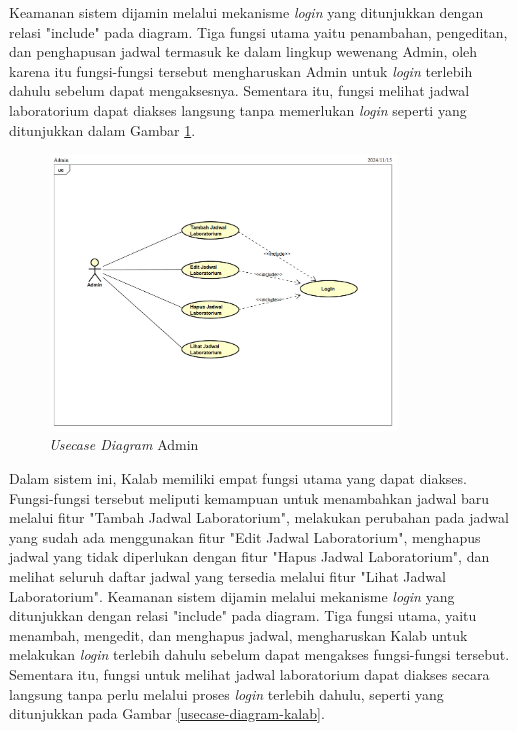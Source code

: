 Keamanan sistem dijamin melalui mekanisme \textit{login} yang ditunjukkan dengan relasi "include" pada diagram. Tiga fungsi utama yaitu penambahan, pengeditan, dan penghapusan jadwal termasuk ke dalam lingkup wewenang Admin, oleh karena itu fungsi-fungsi tersebut mengharuskan Admin untuk \textit{login} terlebih dahulu sebelum dapat mengaksesnya. Sementara itu, fungsi melihat jadwal laboratorium dapat diakses langsung tanpa memerlukan \textit{login} seperti yang ditunjukkan dalam Gambar \ref{usecase-diagram-admin}.
\begin{figure}
	\centering
	\includegraphics[width=0.82\textwidth]{konten/gambar/usecase-diagram/admin.png}
	\caption{\textit{Usecase Diagram} Admin}
	\label{usecase-diagram-admin}
\end{figure}

Dalam sistem ini, Kalab memiliki empat fungsi utama yang dapat diakses. Fungsi-fungsi tersebut meliputi kemampuan untuk menambahkan jadwal baru melalui fitur "Tambah Jadwal Laboratorium", melakukan perubahan pada jadwal yang sudah ada menggunakan fitur "Edit Jadwal Laboratorium", menghapus jadwal yang tidak diperlukan dengan fitur "Hapus Jadwal Laboratorium", dan melihat seluruh daftar jadwal yang tersedia melalui fitur "Lihat Jadwal Laboratorium". Keamanan sistem dijamin melalui mekanisme \textit{login} yang ditunjukkan dengan relasi "include" pada diagram. Tiga fungsi utama, yaitu menambah, mengedit, dan menghapus jadwal, mengharuskan Kalab untuk melakukan \textit{login} terlebih dahulu sebelum dapat mengakses fungsi-fungsi tersebut. Sementara itu, fungsi untuk melihat jadwal laboratorium dapat diakses secara langsung tanpa perlu melalui proses \textit{login} terlebih dahulu, seperti yang ditunjukkan pada Gambar \ref{usecase-diagram-kalab}.

